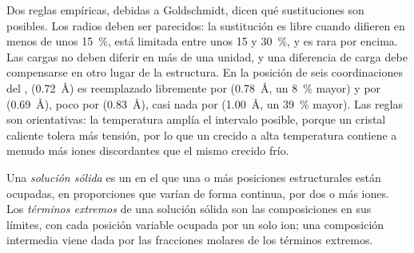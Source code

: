 Dos reglas empíricas, debidas a Goldschmidt, dicen qué sustituciones son posibles. Los radios deben ser
parecidos: la sustitución es libre cuando difieren en menos de unos \qty{15}{\percent}, está limitada entre
unos 15 y \qty{30}{\percent}, y es rara por encima. Las cargas no deben diferir en más de una unidad, y una
diferencia de carga debe compensarse en otro lugar de la estructura. En la posición de seis coordinaciones del
,  (\qty{0.72}{\angstrom}) es reemplazado libremente por  (\qty{0.78}{\angstrom},
un \qty{8}{\percent} mayor) y por  (\qty{0.69}{\angstrom}), poco por 
(\qty{0.83}{\angstrom}), casi nada por  (\qty{1.00}{\angstrom}, un \qty{39}{\percent} mayor).
Las reglas son orientativas: la temperatura amplía el intervalo posible, porque un cristal caliente tolera más
tensión, por lo que un  crecido a alta temperatura contiene a menudo más iones discordantes que el mismo
 crecido frío.

\begin{definition}\label{def:b1:rock-forming-minerals:solid-solution}
Una \emph{solución sólida} es un  en el que una o más posiciones
estructurales están ocupadas, en proporciones que varían de forma continua, por dos o más iones. Los
\emph{términos extremos} de una solución sólida son las composiciones en sus límites,
con cada posición variable ocupada por un solo ion; una composición intermedia viene dada por las fracciones
molares de los términos extremos.
\end{definition}

